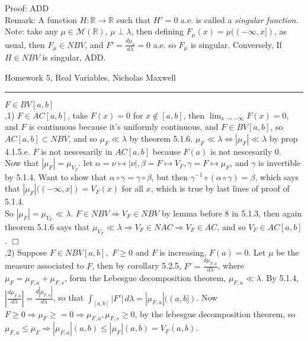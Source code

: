 \documentclass[12pt]{article}
\newcommand{\reals}[0] { \mathbb{R}}
\newcommand{\M}[0] { \mathcal{M} }
\newcommand{\rimply}[0] { \Rightarrow }
\newcommand{\lrimply}[0] { \Leftrightarrow }
\newcommand{\rarw}[0] { \rightarrow }
\begin{document}
\noindent
Proof: ADD \\

Remark: A function $H: \reals \rarw \reals$ such that $H'=0$ a.e. is called a \emph{singular function}. Note: take any $\mu \in \M(\reals)$, $\mu \perp \lambda$, then defining $F_\mu(x) = \mu((-\infty,x])$, as usual, then $F_\mu \in NBV$, and $F' = \frac{d\mu_a}{d\lambda} = 0$ a.e. so $F_\mu$ is singular. Conversely, If $H \in NBV$ is singular,  ADD.


\break


\begin{flushleft}
Homework 5, Real Variables, Nicholas Maxwell\\
\end{flushleft}

\begin{flushleft}
\addvspace{5pt} \hrule
\end{flushleft}	


$F \in BV[a,b]$ \\

,1) $F \in AC[a,b]$, take $F(x) = 0$ for $x \not \in [a,b]$, then $\lim_{x \rarw - \infty} F(x) = 0$, and $F$ is continuous because it's uniformly continuous, and $F \in BV[a,b]$, so $AC[a,b] \subset NBV$, and so $\mu_F \ll \lambda$ by theorem 5.1.6. $\mu_F \ll \lambda \lrimply |\mu_F| \ll \lambda$ by prop 4.1.5.e. $F$ is not nescesarily in $AC[a,b]$ because $F(a)$ is not nescesarily 0. \\

\noindent
Now that $|\mu_F| = \mu_{V_F}$. let $\alpha = \nu \mapsto |\nu|, \beta = F \mapsto V_F, \gamma = F \mapsto \mu_F$, and $\gamma$ is invertible by 5.1.4. Want to show that $\alpha \circ \gamma = \gamma \circ \beta$, but then $ \gamma^{-1} \circ ( \alpha \circ \gamma) = \beta$, which says that $|\mu_F|((-\infty,x]) = V_F(x)$ for all $x$, which is true by last lines of proof of 5.1.4.\\


So $|\mu_F| = \mu_{V_F} \ll \lambda$. $F \in NBV \rimply V_F \in NBV$  by lemma before 8 in 5.1.3, then again theorem 5.1.6 says that $\mu_{V_F} \ll \lambda \rimply  V_F \in NAC \rimply V_F \in AC$, and so $V_F \in AC[a,b]$. $\Box$ \\

,2) Suppose $F \in NBV[a,b],$ $F \ge 0$ and $F$ is increasing, $F(a)=0$. Let $\mu$ be the measure associated to $F$, then by corollary 5.2.5, $F' = \frac{d \mu_{F,a}}{d \lambda}$, where $\mu_{F} = \mu_{F,a} + \mu_{F,s}$, form the Lebesgue decomposition theorem, $\mu_{F,a} \ll \lambda$. By 5.1.4, $|\frac{d \mu_{F,a}}{d \lambda}| = \frac{d |\mu_{F,a}|}{d \lambda}$, so that $\int_{[a,b]} |F'| \, d\lambda = |\mu_{F,a}|((a,b])$. Now $F \ge 0 \rimply \mu_F \ge = 0 \rimply \mu_{F,a},\mu_{F,s} \ge 0$, by the lebesgue decomposition theorem, so $\mu_{F,a} \le \mu_F \rimply |\mu_{F,a}|(a,b) \le |\mu_F |(a,b)  = V_F(a,b)$. \\
\end{document}
